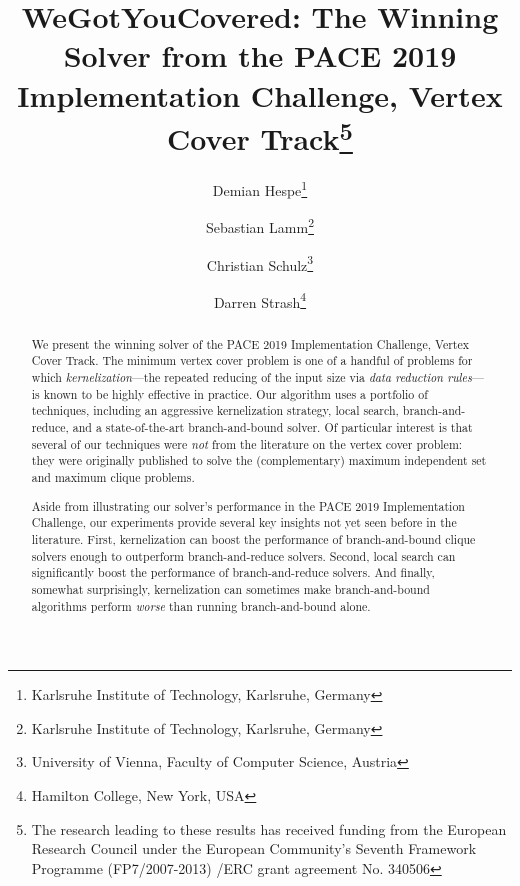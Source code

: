 \documentclass[twoside,leqno,twocolumn]{article}
\newcommand{\mytitle}{WeGotYouCovered: The Winning Solver from the PACE 2019 Implementation Challenge, Vertex Cover Track}
\begin{document}
\title{\mytitle\thanks{
    The research leading to these results has received funding from the European Research Council under the European Community's Seventh Framework Programme (FP7/2007-2013) /ERC grant agreement No. 340506}}
\author{Demian Hespe\thanks{Karlsruhe Institute of Technology, Karlsruhe, Germany} \and Sebastian Lamm\thanks{Karlsruhe Institute of Technology, Karlsruhe, Germany} \and Christian Schulz\thanks{University of Vienna, Faculty of Computer Science, Austria} \and Darren Strash\thanks{Hamilton College, New York, USA}}


\date{}


\maketitle
\begin{abstract}
We present the winning solver of the PACE 2019 Implementation Challenge, Vertex Cover Track. The minimum vertex cover problem is one of a handful of problems for which \emph{kernelization}---the repeated reducing of the input size via \emph{data reduction rules}---is known to be highly effective in practice. Our algorithm uses a portfolio of techniques, including an aggressive kernelization strategy, local search, branch-and-reduce, and a state-of-the-art branch-and-bound solver. Of particular interest is that several of our techniques were \emph{not} from the literature on the vertex cover problem: they were originally published to solve the (complementary) maximum independent set and maximum clique problems. 

%
Aside from illustrating our solver's performance in the PACE 2019 Implementation Challenge, our experiments provide several key insights not yet seen before in the literature.
First, kernelization can boost the performance of branch-and-bound clique solvers enough to outperform branch-and-reduce solvers. Second, local search can significantly boost the performance of branch-and-reduce solvers. And finally, somewhat surprisingly, kernelization can sometimes make branch-and-bound algorithms perform \emph{worse} than running branch-and-bound alone.
\end{abstract}
\end{document}
